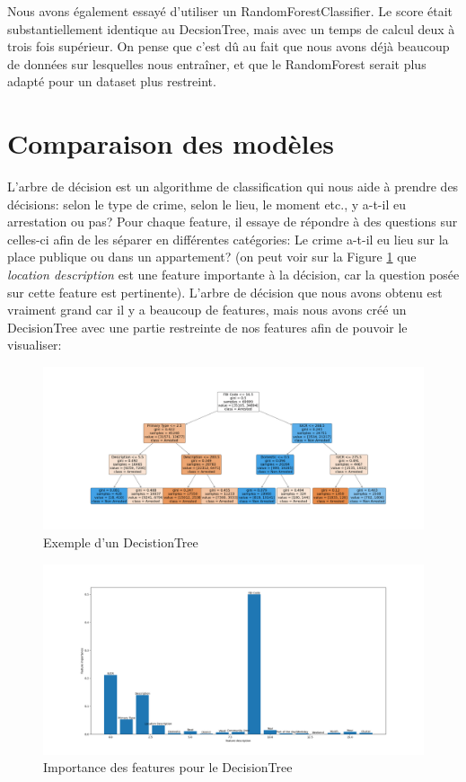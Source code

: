 \documentclass{article}
\begin{document}
    Nous avons également essayé d'utiliser un RandomForestClassifier. 
    Le score était substantiellement identique au DecsionTree, mais avec un 
    temps de calcul deux à trois fois supérieur. On pense que c'est dû au
    fait que nous avons déjà beaucoup de données sur lesquelles nous entraîner, 
    et que le RandomForest serait plus adapté pour un dataset plus restreint.

    \section{Comparaison des modèles}

    L'arbre de décision est un algorithme de classification qui nous aide 
    à prendre des décisions:
    selon le type de crime, selon le lieu, le moment etc., y a-t-il eu 
    arrestation ou pas?  Pour chaque feature, il essaye de répondre à des  
    questions sur celles-ci afin de les séparer en différentes catégories:
    Le crime a-t-il eu lieu sur la place publique ou dans un appartement?
    (on peut voir sur la Figure \ref{D} que \textit{location description} est une feature
    importante à la décision, car la question posée sur cette feature est pertinente).
    L'arbre de décision que nous avons obtenu est vraiment grand car il y a beaucoup de
    features, mais nous avons créé un DecisionTree avec une partie restreinte de
    nos features afin de pouvoir le visualiser:

    \begin{figure}[H]
            \centering
	    \includegraphics[scale=.18]{images/treeExample.png}
	    \caption{Exemple d'un DecistionTree}
    \end{figure}
    \begin{figure}[H]
            \centering
	    \includegraphics[scale=.3]{images/feature_importance.png}
	    \caption{Importance des features pour le DecisionTree}
	    \label{D}
    \end{figure}
\end{document}
